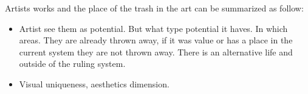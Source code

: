 Artists works and the place of the trash in the art can be summarized as follow:
\begin{itemize}
\item Artist see them as potential. But what type potential it haves. In which areas. They are already thrown away, if it was value or has a place in the current system they are not thrown away. There is an alternative life and outside of the ruling system.
\item Visual uniqueness, aesthetics dimension.
\end{itemize}










